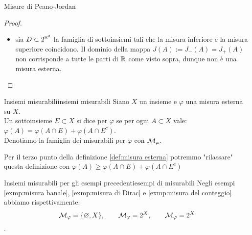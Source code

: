 \begin{remark}{Misure di Peano-Jordan}{}
\begin{proof}
\begin{itemize}
            \[\mc{I}_+(A) := \left\{ \{I_i\}_1^n : I_i \text{ intervalli},\quad \bigcup_{i=1}^n I_i \supseteq A, \quad I_i \cap I_j = \varnothing \quad \text{se }i \neq j \right\}\]
            Notiamo che questo è definito per gli insiemi limitati, dunque per questi definiamo la misura superiore di Peano-Jordan
            \[J_+(A) := \begin{cases}
                0 \quad\text{se } \mc{I}_+(A) = \varnothing\\
                \inf_{\mc{I}_+(A)} S \quad\text{se }A\text{ limitato}\\
                \lim_{\rho \to +\infty} J_+(A\cap B_\rho(\mathbf{0})) \quad\text{altrimenti}
            \end{cases}\]
            L'esistenza del limite segue dalla monotonia inversa di $\mc{I}_+$ e $\inf$. Verifichiamo gli assiomi di misura esterna
            \begin{enumerate}
                \item $J_+{\varnothing} = 0$ banalmente.
                \item Abbiamo già dimostrato la monotonia.
                \item Osserviamo che $J_+(\Q\cap ]0,1[)>0$, mentre (indicizzando $\Q$) $\sum_j J_+(\{q_j\}) = 0$.
            \end{enumerate}
            \item {} sia $D \subset 2^{\mathbb{R}^2}$ la famiglia di sottoinsiemi tali che la misura inferiore e la misura superiore coincidono. Il dominio della mappa $J(A) := J_-(A)=J_+(A)$ non corrisponde a tutte le parti di $\mathbb{R}$ come visto sopra, dunque non è una misura esterna.
        \end{itemize}
    \end{proof}    
\end{remark}

\begin{definition}{Insiemi misurabili}{insiemi misurabili}
    Siano $X$ un insieme e $\varphi$ una misura esterna su $X$.\\
    Un sottoinsieme $E\subset X$ si dice  per $\varphi$ se per ogni $A\subset X$ vale: $\varphi(A) = \varphi(A \cap E) + \varphi(A\cap E^c)$.\\
    Denotiamo la famiglia dei misurabili per $\varphi$ con $\mathcal{M}_\varphi$.
\end{definition}
\begin{remark}{}{}
    Per il terzo punto della definizione \ref{def:misura esterna} potremmo "rilassare" questa definizione con $\varphi(A) \ge \varphi(A \cap E) + \varphi(A\cap E^c)$
\end{remark}
\begin{example}{Insiemi misurabili per gli esempi precedenti}{esempi di misurabili}
    Negli esempi \ref{exmp:misura banale}, \ref{exmp:misura di Dirac} e \ref{exmp:misura del conteggio} abbiamo rispettivamente:
    \[\mathcal{M}_\varphi = \{\varnothing, X\}, \qquad \mathcal{M}_\varphi = 2^X, \qquad \mathcal{M}_\varphi = 2^X\].
\end{example}

